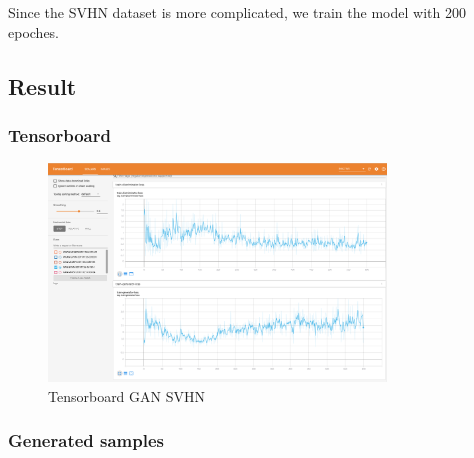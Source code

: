 \documentclass{article}
\begin{document}
Since the SVHN dataset is more complicated, we train the model with 200 epoches.

\subsection{Result}

\subsubsection{Tensorboard}

\begin{figure}[!htb]
  \centering
  \includegraphics[width=0.8\textwidth]{tensorboard-GAN-SVHN.png}
  \caption{Tensorboard GAN SVHN}
  \label{fig:TB_GAN_SVHN}
\end{figure}

\subsubsection{Generated samples}
\end{document}
